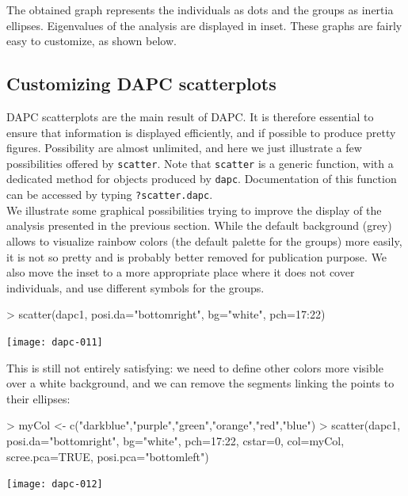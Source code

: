 \documentclass{article}
\begin{document}
\noindent The obtained graph represents the individuals as dots and the groups as inertia
ellipses. Eigenvalues of the analysis are displayed in inset. These graphs are fairly easy to
customize, as shown below.




\subsection{Customizing DAPC scatterplots}

DAPC scatterplots are the main result of DAPC. It is therefore essential to ensure that information
is displayed efficiently, and if possible to produce pretty figures.
Possibility are almost unlimited, and here we just illustrate a few possibilities offered by
\texttt{scatter}. Note that \texttt{scatter} is a generic function, with a dedicated method for
objects produced by \texttt{dapc}. Documentation of this function can be accessed by typing \texttt{?scatter.dapc}.
\\

We illustrate some graphical possibilities trying to improve the display of the analysis presented
in the previous section.
While the default background (grey) allows to visualize rainbow colors (the default palette for the
groups) more easily, it is not so pretty and is probably better removed for publication purpose.
We also move the inset to a more appropriate place where it does not cover individuals, and use
different symbols for the groups.

\begin{Schunk}
\begin{Sinput}
> scatter(dapc1, posi.da="bottomright", bg="white", pch=17:22)
\end{Sinput}
\end{Schunk}
\texttt{[image: dapc-011]}

\noindent This is still not entirely satisfying: we need to define other colors more visible over a white
background, and we can remove the segments linking the points to their ellipses:
\begin{Schunk}
\begin{Sinput}
> myCol <- c("darkblue","purple","green","orange","red","blue")
> scatter(dapc1, posi.da="bottomright",  bg="white", pch=17:22, cstar=0, col=myCol, scree.pca=TRUE, posi.pca="bottomleft")
\end{Sinput}
\end{Schunk}
\texttt{[image: dapc-012]}
\end{document}

